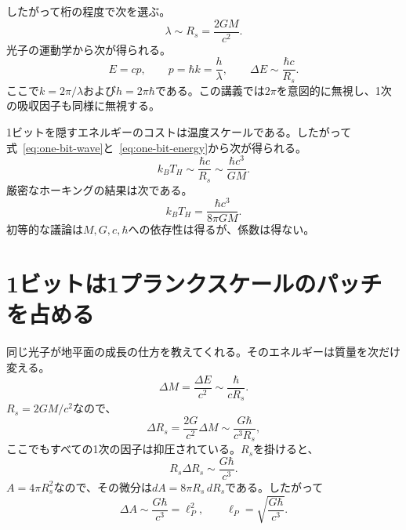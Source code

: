 したがって桁の程度で次を選ぶ。
\begin{equation}
\lambda\sim R_s=\frac{2GM}{c^2}.
\label{eq:one-bit-wave}
\end{equation}
光子の運動学から次が得られる。
\begin{equation}
E=cp,
\qquad
p=\hbar k=\frac{h}{\lambda},
\qquad
\Delta E\sim\frac{\hbar c}{R_s}.
\label{eq:one-bit-energy}
\end{equation}
ここで\(k=2\pi/\lambda\)および\(h=2\pi\hbar\)である。この講義では\(2\pi\)を意図的に無視し、1次の吸収因子も同様に無視する。

\begin{classroomqa}
\end{classroomqa}

1ビットを隠すエネルギーのコストは温度スケールである。したがって式~\eqref{eq:one-bit-wave}と~\eqref{eq:one-bit-energy}から次が得られる。
\begin{equation}
k_BT_H\sim\frac{\hbar c}{R_s}
\sim\frac{\hbar c^3}{GM}.
\end{equation}
厳密なホーキングの結果は次である。
\begin{equation}
k_BT_H=\frac{\hbar c^3}{8\pi GM}.
\end{equation}
初等的な議論は\(M,G,c,\hbar\)への依存性は得るが、係数は得ない。

\section{1ビットは1プランクスケールのパッチを占める}

同じ光子が地平面の成長の仕方を教えてくれる。そのエネルギーは質量を次だけ変える。
\begin{equation}
\Delta M=\frac{\Delta E}{c^2}
\sim\frac{\hbar}{cR_s}.
\end{equation}
\(R_s=2GM/c^2\)なので、
\begin{equation}
\Delta R_s=\frac{2G}{c^2}\Delta M
\sim\frac{G\hbar}{c^3R_s},
\end{equation}
ここでもすべての1次の因子は抑圧されている。\(R_s\)を掛けると、
\begin{equation}
R_s\Delta R_s\sim\frac{G\hbar}{c^3}.
\end{equation}
\(A=4\pi R_s^2\)なので、その微分は\(dA=8\pi R_s\,dR_s\)である。したがって
\begin{equation}
\Delta A\sim\frac{G\hbar}{c^3}=\ell_P^2,
\qquad
\ell_P=\sqrt{\frac{G\hbar}{c^3}}.
\label{eq:planck-patch}
\end{equation}

